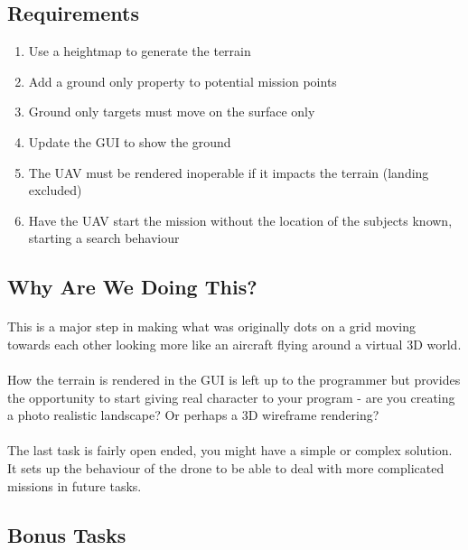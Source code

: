 \documentclass[11pt]{book}
\begin{document}
\subsection{Requirements}

\begin{enumerate}
\item Use a heightmap to generate the terrain
\item Add a ground only property to potential mission points
\item Ground only targets must move on the surface only
\item Update the GUI to show the ground
\item The UAV must be rendered inoperable if it impacts the terrain (landing excluded)
\item Have the UAV start the mission without the location of the subjects known, starting a search behaviour
\end{enumerate}

\subsection{Why Are We Doing This?}

\paragraph{} This is a major step in making what was originally dots on a grid moving towards each other looking more like an aircraft flying around a virtual 3D world.

\paragraph{} How the terrain is rendered in the GUI is left up to the programmer but provides the opportunity to start giving real character to your program - are you creating a photo realistic landscape? Or perhaps a 3D wireframe rendering?

\paragraph{} The last task is fairly open ended, you might have a simple or complex solution. It sets up the behaviour of the drone to be able to deal with more complicated missions in future tasks.

\subsection{Bonus Tasks}
\end{document}
